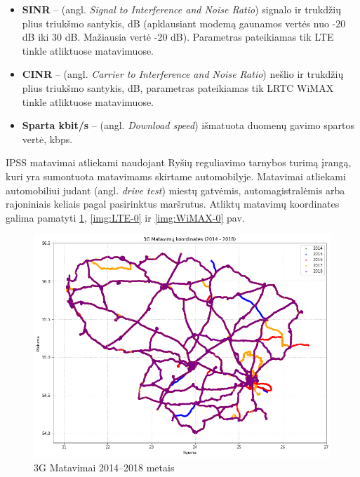 \documentclass{VUMIFPSbakalaurinis}
\begin{document}
\begin{itemize}
	\item \textbf{SINR} – (angl. \textit{Signal to Interference and Noise Ratio})  signalo ir trukdžių plius triukšmo santykis, dB (apklausiant modemą gaunamos vertės nuo -20 dB iki 30 dB. Mažiausia vertė -20 dB). Parametras pateikiamas tik LTE tinkle atliktuose matavimuose.
	\item \textbf{CINR} – (angl. \textit{Carrier to Interference and Noise Ratio}) nešlio ir trukdžių plius triukšmo santykis, dB, parametras pateikiamas tik LRTC WiMAX tinkle atliktuose matavimuose.
	\item \textbf{Sparta kbit/s} – (angl. \textit{Download speed}) išmatuota duomenų gavimo spartos vertė, kbps.
\end{itemize}
IPSS matavimai atliekami naudojant Ryšių reguliavimo tarnybos turimą įrangą, kuri yra sumontuota matavimams skirtame automobilyje. Matavimai atliekami automobiliui judant (angl. \textit{drive test}) miestų gatvėmis, automagistralėmis arba rajoniniais keliais pagal pasirinktus maršrutus. Atliktų matavimų koordinates galima pamatyti \ref{img:3G-0}, \ref{img:LTE-0} ir \ref{img:WiMAX-0} pav.
\begin{figure}[H]
	\centering
	\includegraphics[scale=0.5]{img/3G-0}
	\caption{3G Matavimai 2014–2018 metais}
	\label{img:3G-0}
\end{figure}
\end{document}
